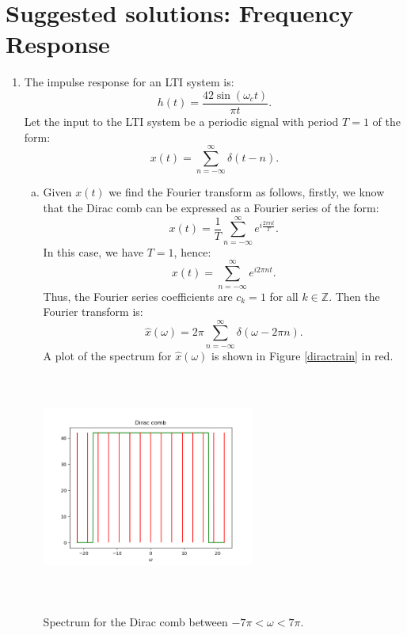 
\newpage
\section{Suggested solutions: Frequency Response}

\begin{enumerate}
  \item The impulse response for an LTI system is:
        \[ h(t)=\frac{42\sin(\omega_{c}t)}{\pi t}. \]
        Let the input to the LTI system be a periodic signal with period $T=1$ of the form:
        \[ x(t)=\sum_{n=-\infty}^{\infty}\delta(t-n). \]

        \begin{enumerate}[a)]
          \item Given $x(t)$ we find the Fourier transform as follows, firstly, we know that 
                the Dirac comb can be expressed as a Fourier series of the form:
                \[ x(t)=\frac{1}{T}\sum_{n=-\infty}^{\infty}e^{i\frac{2\pi nt}{T}}. \]
                In this case, we have $T=1$, hence:
                \[ x(t)=\sum_{n=-\infty}^{\infty}e^{i2\pi nt}. \]
                Thus, the Fourier series coefficients are $c_{k}=1$ for all $k\in\mathbb{Z}$. Then the Fourier transform is:
                \[ \hat{x}(\omega)=2\pi\sum_{n=-\infty}^{\infty}\delta(\omega-2\pi n). \]
                A plot of the spectrum for $\hat{x}(\omega)$ is shown in Figure \ref{diractrain} in red.

                \begin{marginfigure}[1cm]
                  \includegraphics[height=7.5cm, width=7.0cm]{ch11/figures/diractrain.png}
                  \caption{Spectrum for the Dirac comb between $-7\pi<\omega<7\pi$.}
                  \label{diractrain}
                \end{marginfigure}


\end{enumerate}
\end{enumerate}
